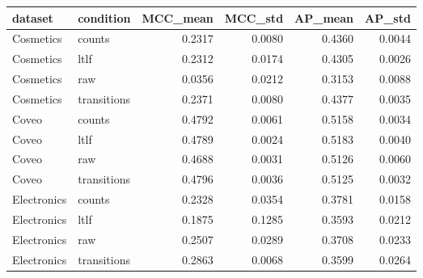 \begin{tabular}{llrrrr}
\toprule
dataset & condition & MCC\_mean & MCC\_std & AP\_mean & AP\_std \\
\midrule
Cosmetics & counts & 0.2317 & 0.0080 & 0.4360 & 0.0044 \\
Cosmetics & ltlf & 0.2312 & 0.0174 & 0.4305 & 0.0026 \\
Cosmetics & raw & 0.0356 & 0.0212 & 0.3153 & 0.0088 \\
Cosmetics & transitions & 0.2371 & 0.0080 & 0.4377 & 0.0035 \\
Coveo & counts & 0.4792 & 0.0061 & 0.5158 & 0.0034 \\
Coveo & ltlf & 0.4789 & 0.0024 & 0.5183 & 0.0040 \\
Coveo & raw & 0.4688 & 0.0031 & 0.5126 & 0.0060 \\
Coveo & transitions & 0.4796 & 0.0036 & 0.5125 & 0.0032 \\
Electronics & counts & 0.2328 & 0.0354 & 0.3781 & 0.0158 \\
Electronics & ltlf & 0.1875 & 0.1285 & 0.3593 & 0.0212 \\
Electronics & raw & 0.2507 & 0.0289 & 0.3708 & 0.0233 \\
Electronics & transitions & 0.2863 & 0.0068 & 0.3599 & 0.0264 \\
\bottomrule
\end{tabular}
